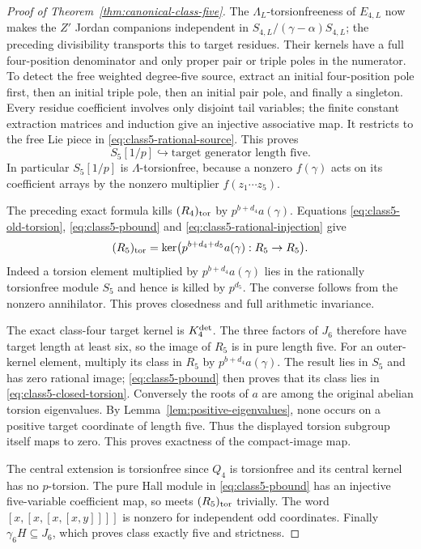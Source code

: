 \begin{proof}[Proof of Theorem~\ref{thm:canonical-class-five}]
The $\Lambda_L$-torsionfreeness of $E_{4,L}$ now makes
the $Z'$ Jordan companions independent in
$S_{4,L}/(\gamma-\alpha)S_{4,L}$; the preceding
divisibility transports this to target
residues. Their kernels have a full four-position
denominator and only proper pair or triple poles
in the numerator. To detect the free weighted
degree-five source, extract an initial four-position
pole first, then an initial triple pole, then an
initial pair pole, and finally a singleton. Every
residue coefficient involves only disjoint tail
variables; the finite constant extraction matrices
and induction give an injective associative map.
It restricts to the free Lie piece in
\eqref{eq:class5-rational-source}. This proves
\begin{equation}\label{eq:class5-rational-injection}
 S_5[1/p]\hookrightarrow\text{target generator length five}.
\end{equation}
In particular $S_5[1/p]$ is $\Lambda$-torsionfree,
because a nonzero $f(\gamma)$ acts on its coefficient
arrays by the nonzero multiplier $f(z_1\cdots z_5)$.

The preceding exact formula kills $(R_4)_{\rm tor}$
by $p^{b+d_4}a(\gamma)$. Equations
\eqref{eq:class5-old-torsion},
\eqref{eq:class5-pbound} and
\eqref{eq:class5-rational-injection} give
\begin{equation}\label{eq:class5-closed-torsion}
 (R_5)_{\rm tor}
      =\ker\bigl(p^{b+d_4+d_5}a(\gamma):R_5\to R_5\bigr).
\end{equation}
Indeed a torsion element multiplied by
$p^{b+d_4}a(\gamma)$ lies in the rationally torsionfree
module $S_5$ and hence is killed by $p^{d_5}$.
The converse follows from the nonzero annihilator.
This proves closedness and full arithmetic invariance.

The exact class-four target kernel is $K_4^{\rm det}$.
The three factors of $J_6$ therefore have target
length at least six, so the image of $R_5$ is in pure
length five. For an outer-kernel element,
multiply its class in $R_5$ by $p^{b+d_4}a(\gamma)$.
The result lies in $S_5$ and has zero rational image;
\eqref{eq:class5-pbound} then proves that its class
lies in \eqref{eq:class5-closed-torsion}.
Conversely the roots of $a$ are among the original
abelian torsion eigenvalues. By
Lemma~\ref{lem:positive-eigenvalues}, none occurs on
a positive target coordinate of length five.
Thus the displayed torsion subgroup itself maps to
zero. This proves exactness of the compact-image map.

The central extension is torsionfree since $Q_4$ is
torsionfree and its central kernel has no $p$-torsion.
The pure Hall module in \eqref{eq:class5-pbound}
has an injective five-variable coefficient map,
so meets $(R_5)_{\rm tor}$ trivially. The word
$[x,[x,[x,[x,y]]]]$ is nonzero for independent odd
coordinates. Finally $\gamma_6H\subseteq J_6$,
which proves class exactly five and strictness.
\end{proof}

